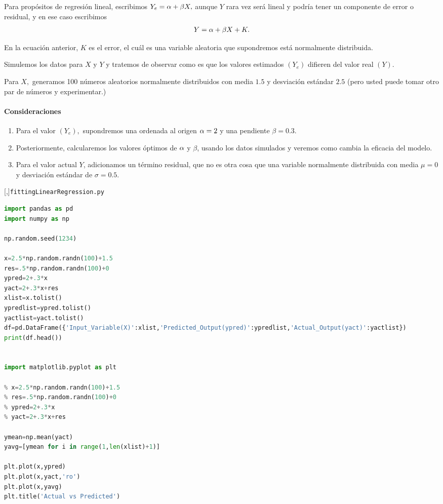 Para propósitos de regresión lineal, escribimos $Y_{e}=\alpha+\beta X,$ aunque $Y$ rara vez será lineal y podría tener un componente de error o residual, y en ese caso escribimos
\begin{align}
 Y=\alpha + \beta X + K.
\end{align}


En la ecuación anterior, $K$ es el error, el cuál es una variable aleatoria que supondremos está normalmente distribuida.


Simulemos los datos para $X$ y $Y$ y tratemos de observar como es que los valores estimados $\left( Y_{e} \right)$ difieren del valor real $\left( Y \right)$.


Para $X,$ generamos 100 números aleatorios normalmente distribuidos con media $1.5$ y desviación estándar $2.5$ (pero usted puede tomar otro par de números y experimentar.)


\paragraph{Consideraciones}
\begin{enumerate}
 \item Para el valor $(Y_{e}),$ supondremos una ordenada al origen $\alpha=2$ y una pendiente $\beta=0.3$. 

 \item
Posteriormente, calcularemos los valores óptimos de $\alpha$ y $\beta$, usando los datos simulados y veremos como cambia la eficacia del modelo.

\item
Para el valor actual $Y$, adicionamos un término residual, que no es otra cosa que una variable normalmente distribuida con media $\mu=0$ y desviación estándar de $\sigma=0.5$.
\end{enumerate}


[,]{\texttt{fittingLinearRegression.py}}
\begin{lstlisting}[language=Python]
import pandas as pd
import numpy as np

np.random.seed(1234)

x=2.5*np.random.randn(100)+1.5
res=.5*np.random.randn(100)+0
ypred=2+.3*x
yact=2+.3*x+res
xlist=x.tolist()
ypredlist=ypred.tolist()
yactlist=yact.tolist()
df=pd.DataFrame({'Input_Variable(X)':xlist,'Predicted_Output(ypred)':ypredlist,'Actual_Output(yact)':yactlist})
print(df.head())


import matplotlib.pyplot as plt

% x=2.5*np.random.randn(100)+1.5
% res=.5*np.random.randn(100)+0
% ypred=2+.3*x
% yact=2+.3*x+res

ymean=np.mean(yact)
yavg=[ymean for i in range(1,len(xlist)+1)]

plt.plot(x,ypred)
plt.plot(x,yact,'ro')
plt.plot(x,yavg)
plt.title('Actual vs Predicted')
\end{lstlisting}

